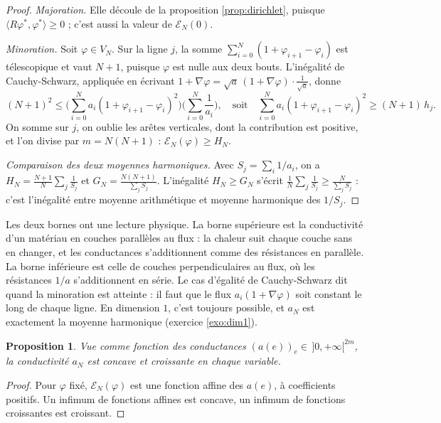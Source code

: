 \documentclass[11pt,a4paper]{article}
\theoremstyle{plain}
\newtheorem{proposition}[theoreme]{Proposition}
\theoremstyle{definition}
\theoremstyle{remark}
\newcommand{\E}{\mathcal{E}}
\newcommand{\ps}[2]{\langle #1,#2\rangle}
\begin{document}
\begin{proof}
\emph{Majoration.} Elle découle de la proposition \ref{prop:dirichlet}, puisque $\ps{R\varphi^*}{\varphi^*}\geq0$ ; c'est aussi la valeur de $\E_N(0)$.

\emph{Minoration.} Soit $\varphi\in V_N$. Sur la ligne $j$, la somme $\sum_{i=0}^N(1+\varphi_{i+1}-\varphi_i)$ est télescopique et vaut $N+1$, puisque $\varphi$ est nulle aux deux bouts. L'inégalité de Cauchy-Schwarz, appliquée en écrivant $1+\nabla\varphi=\sqrt a\,(1+\nabla\varphi)\cdot\frac1{\sqrt a}$, donne
\[
  (N+1)^2\leq\Big(\sum_{i=0}^N a_i(1+\varphi_{i+1}-\varphi_i)^2\Big)\Big(\sum_{i=0}^N\frac1{a_i}\Big),
  \quad\text{soit}\quad
  \sum_{i=0}^N a_i(1+\varphi_{i+1}-\varphi_i)^2\geq(N+1)\,h_j .
\]
On somme sur $j$, on oublie les arêtes verticales, dont la contribution est positive, et l'on divise par $m=N(N+1)$ : $\E_N(\varphi)\geq H_N$.

\emph{Comparaison des deux moyennes harmoniques.} Avec $S_j=\sum_i1/a_i$, on a $H_N=\frac{N+1}N\sum_j\frac1{S_j}$ et $G_N=\frac{N(N+1)}{\sum_jS_j}$. L'inégalité $H_N\geq G_N$ s'écrit $\frac1N\sum_j\frac1{S_j}\geq\frac N{\sum_jS_j}$ : c'est l'inégalité entre moyenne arithmétique et moyenne harmonique des $1/S_j$.
\end{proof}

Les deux bornes ont une lecture physique. La borne supérieure est la conductivité d'un matériau en couches parallèles au flux : la chaleur suit chaque couche sans en changer, et les conductances s'additionnent comme des résistances en parallèle. La borne inférieure est celle de couches perpendiculaires au flux, où les résistances $1/a$ s'additionnent en série. Le cas d'égalité de Cauchy-Schwarz dit quand la minoration est atteinte : il faut que le flux $a_i(1+\nabla\varphi)$ soit constant le long de chaque ligne. En dimension $1$, c'est toujours possible, et $a_N$ est exactement la moyenne harmonique (exercice \ref{exo:dim1}).

\begin{proposition}\label{prop:concave}
Vue comme fonction des conductances $(a(e))_e\in\,]0,+\infty[^{2m}$, la conductivité $a_N$ est concave et croissante en chaque variable.
\end{proposition}

\begin{proof}
Pour $\varphi$ fixé, $\E_N(\varphi)$ est une fonction affine des $a(e)$, à coefficients positifs. Un infimum de fonctions affines est concave, un infimum de fonctions croissantes est croissant.
\end{proof}
\end{document}

